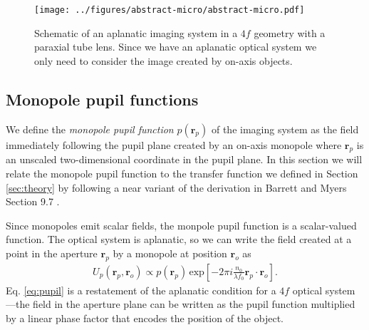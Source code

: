 \documentclass[]{osa-article}
\providecommand{\ro}{\mathbf{\mathbf{r}}_o}
\providecommand{\rp}{\mathbf{r}_p}
\begin{document}
\begin{figure}[h]
 \centering
   \centering
   \texttt{[image: ../figures/abstract-micro/abstract-micro.pdf]}
   \caption{Schematic of an aplanatic imaging system in a $4f$ geometry with a
     paraxial tube lens. Since we have an aplanatic optical system we only need
     to consider the image created by on-axis objects.}
   \label{fig:schematic}
 \end{figure}

\subsection{Monopole pupil functions}
We define the \textit{monopole pupil function} $p(\rp)$ of the imaging system as
the field immediately following the pupil plane created by an on-axis
monopole where $\rp$ is an unscaled two-dimensional coordinate in the pupil
plane. In this section we will relate the monopole pupil function to the
transfer function we defined in Section \ref{sec:theory} by following a near
variant of the derivation in Barrett and Myers Section 9.7 \cite{barrett2004}.

Since monopoles emit scalar fields, the monpole pupil function is a
scalar-valued function. The optical system is aplanatic, so we can write the
field created at a point in the aperture $\rp$ by a monopole at position $\ro$
as
\begin{align}
   U_p(\rp, \ro) \propto p(\rp)\,\text{exp}\left[-2\pi i \frac{n_0}{\lambda f_0} \rp\cdot\ro \right]. \label{eq:pupil}
\end{align}
Eq. \ref{eq:pupil} is a restatement of the aplanatic condition for a $4f$
optical system---the field in the aperture plane can be written as the pupil
function multiplied by a linear phase factor that encodes the position of the
object.
\end{document}
